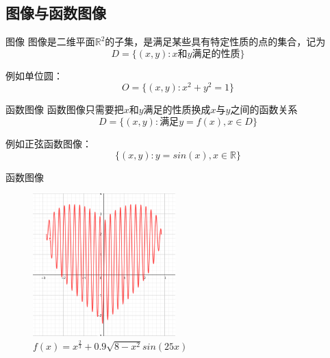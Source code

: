 \documentclass[9pt]{beamer}
\begin{document}
\subsection{图像与函数图像}
\begin{frame}{图像}{}
图像是二维平面$\mathbb{R}^2$的子集，是满足某些具有特定性质的点的集合，记为\\
\begin{equation*}
    D=\{(x,y):x \text{和} y \text{满足的性质}\}
\end{equation*}
 
 例如单位圆：\\
\begin{equation*}
    O=\{(x,y):x^2+y^2=1\}
\end{equation*}
\end{frame}

\begin{frame}{函数图像}{}
函数图像只需要把$x$和$y$满足的性质换成$x$与$y$之间的函数关系
\begin{equation*}
    D=\{(x,y):\text{满足} y=f(x),x\in D\}
\end{equation*}
 
 例如正弦函数图像：\\
\begin{equation*}
    \{(x,y):y=sin(x),x \in \mathbb{R}\}
\end{equation*}
\end{frame}
\begin{frame}{函数图像}
\begin{figure}[h]
\centering
\includegraphics[width=5.5cm,height=5.5cm]{assets/heart.png}
\caption{$f(x)=x^{\frac{2}{3}}+0.9\sqrt{8-x^2}sin(25x)$}
\end{figure}
\end{frame}
\end{document}
